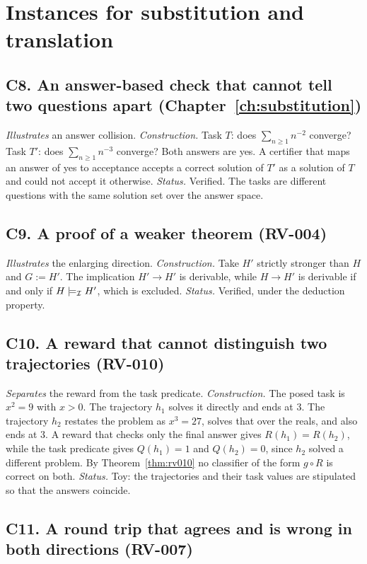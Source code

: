 \section{Instances for substitution and translation}

\subsection*{C8. An answer-based check that cannot tell two questions apart (Chapter~\ref{ch:substitution})}

\emph{Illustrates} an answer collision. \emph{Construction.} Task $T$: does $\sum_{n\ge1}n^{-2}$ converge? Task $T'$: does $\sum_{n\ge1}n^{-3}$ converge? Both answers are yes. A certifier that maps an answer of yes to acceptance accepts a correct solution of $T'$ as a solution of $T$ and could not accept it otherwise. \emph{Status.} Verified. The tasks are different questions with the same solution set over the answer space.

\subsection*{C9. A proof of a weaker theorem (RV-004)}

\emph{Illustrates} the enlarging direction. \emph{Construction.} Take $H'$ strictly stronger than $H$ and $G:=H'$. The implication $H'\to H'$ is derivable, while $H\to H'$ is derivable if and only if $H\models_{\mathcal{I}} H'$, which is excluded. \emph{Status.} Verified, under the deduction property.

\subsection*{C10. A reward that cannot distinguish two trajectories (RV-010)}

\emph{Separates} the reward from the task predicate. \emph{Construction.} The posed task is $x^2=9$ with $x>0$. The trajectory $h_1$ solves it directly and ends at $3$. The trajectory $h_2$ restates the problem as $x^3=27$, solves that over the reals, and also ends at $3$. A reward that checks only the final answer gives $R(h_1)=R(h_2)$, while the task predicate gives $Q(h_1)=1$ and $Q(h_2)=0$, since $h_2$ solved a different problem. By Theorem~\ref{thm:rv010} no classifier of the form $g\circ R$ is correct on both. \emph{Status.} Toy: the trajectories and their task values are stipulated so that the answers coincide.

\subsection*{C11. A round trip that agrees and is wrong in both directions (RV-007)}

